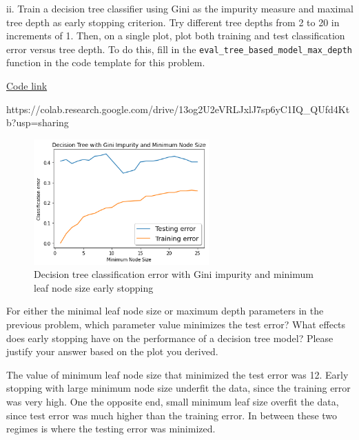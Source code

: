 ii. Train a decision tree classifier using Gini as the impurity measure and maximal tree depth as early stopping criterion. Try different tree depths from 2 to 20 in increments of 1. Then, on a single plot, plot both training and test classification error versus tree depth. To do this, fill in the \texttt{eval_tree_based_model_max_depth} function in the code template for this problem.

\begin{solution}
    \href{https://colab.research.google.com/drive/13og2U2eVRLJxlJ7sp6yC1IQ_QUfd4Ktb?usp=sharing}{Code link}

    https://colab.research.google.com/drive/13og2U2eVRLJxlJ7sp6yC1IQ_QUfd4Ktb?usp=sharing

    \begin{figure}[H]
        \centering
        \includegraphics[width=0.6\textwidth]{plots/2a1.png}
        \caption{Decision tree classification error with Gini impurity and minimum leaf node size early stopping}
        \label{fig:2a1}
    \end{figure}
\end{solution}

\newpage

\problem[6]
For either the minimal leaf node size or maximum depth parameters in the previous problem, which parameter value minimizes the test error? What effects does early stopping have on the performance of a decision tree model?
Please justify your answer based on the plot you derived.

\begin{solution}
   The value of minimum leaf node size that minimized the test error was 12. Early stopping with large minimum node size underfit the data, since the training error was very high. One the opposite end, small minimum leaf size overfit the data, since test error was much higher than the training error. In between these two regimes is where the testing error was minimized.
\end{solution}

